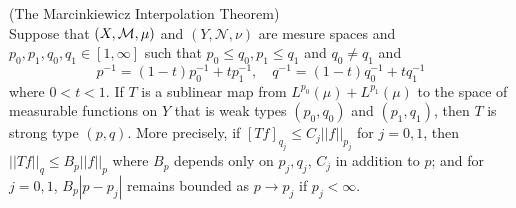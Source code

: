 \begin{theorem}
    (The Marcinkiewicz Interpolation Theorem)\\Suppose that $(X,\mathcal{M},\mu)$ and $(Y,\mathcal{N},\nu)$ are mesure spaces and $p_0,p_1,q_0,q_1 \in [1,\infty]$ such that $p_0 \leq q_0, p_1 \leq q_1$ and $q_0 \neq q_1$ and
    \[
    p^{-1} = (1-t)p_0^{-1} + tp_1^{-1},\quad q^{-1} = (1-t)q_0^{-1}+tq_1^{-1}
    \]
    where $0 < t < 1$. If $T$ is a sublinear map from $L^{p_0}(\mu) + L^{p_1}(\mu)$ to the space of measurable functions on $Y$ that is weak types $(p_0,q_0)$ and $(p_1,q_1)$, then $T$ is strong type $(p,q)$. More precisely, if $[Tf]_{q_j} \leq C_j||f||_{p_j}$ for $j=0,1$, then $||Tf||_q \leq B_p||f||_p$ where $B_p$ depends only on $p_j,q_j$, $C_j$ in addition to $p$; and for $j=0,1$, $B_p|p-p_j|$ remains bounded as $p\to p_j$ if $p_j < \infty$.
\end{theorem}
